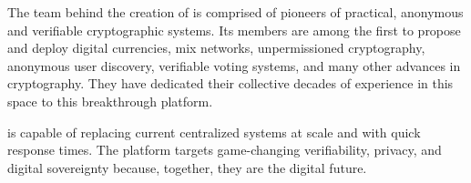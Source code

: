 The team behind the creation of \name is comprised of pioneers of practical, anonymous and verifiable cryptographic systems. Its members are among the first to propose and deploy digital currencies, mix networks, unpermissioned cryptography, anonymous user discovery, verifiable voting systems, and many other advances in cryptography. They have dedicated their collective decades of experience in this space to this breakthrough platform. 

\name is capable of replacing current centralized systems at scale and with quick response times. The \name platform targets game-changing verifiability, privacy, and digital sovereignty because, together, they are the digital future.
